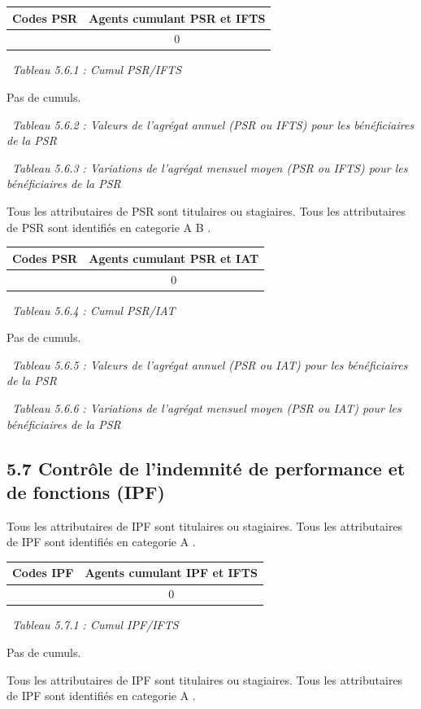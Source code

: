 \begin{longtable}[]{@{}cc@{}}
\toprule
Codes PSR & Agents cumulant PSR et IFTS\tabularnewline
\midrule
\endhead
& 0\tabularnewline
\bottomrule
\end{longtable}

~\emph{Tableau 5.6.1 : Cumul PSR/IFTS}

Pas de cumuls.

~\emph{Tableau 5.6.2 : Valeurs de l'agrégat annuel (PSR ou IFTS) pour
les bénéficiaires de la PSR}

~\emph{Tableau 5.6.3 : Variations de l'agrégat mensuel moyen (PSR ou
IFTS) pour les bénéficiaires de la PSR}

Tous les attributaires de PSR sont titulaires ou stagiaires. Tous les
attributaires de PSR sont identifiés en categorie A B .

\begin{longtable}[]{@{}cc@{}}
\toprule
Codes PSR & Agents cumulant PSR et IAT\tabularnewline
\midrule
\endhead
& 0\tabularnewline
\bottomrule
\end{longtable}

~\emph{Tableau 5.6.4 : Cumul PSR/IAT}

Pas de cumuls.

~\emph{Tableau 5.6.5 : Valeurs de l'agrégat annuel (PSR ou IAT) pour les
bénéficiaires de la PSR}

~\emph{Tableau 5.6.6 : Variations de l'agrégat mensuel moyen (PSR ou
IAT) pour les bénéficiaires de la PSR}

\hypertarget{controle-de-lindemnite-de-performance-et-de-fonctions-ipf}{%
\subsection{5.7 Contrôle de l'indemnité de performance et de fonctions
(IPF)}\label{controle-de-lindemnite-de-performance-et-de-fonctions-ipf}}

Tous les attributaires de IPF sont titulaires ou stagiaires. Tous les
attributaires de IPF sont identifiés en categorie A .

\begin{longtable}[]{@{}cc@{}}
\toprule
Codes IPF & Agents cumulant IPF et IFTS\tabularnewline
\midrule
\endhead
& 0\tabularnewline
\bottomrule
\end{longtable}

~\emph{Tableau 5.7.1 : Cumul IPF/IFTS}

Pas de cumuls.

Tous les attributaires de IPF sont titulaires ou stagiaires. Tous les
attributaires de IPF sont identifiés en categorie A .

